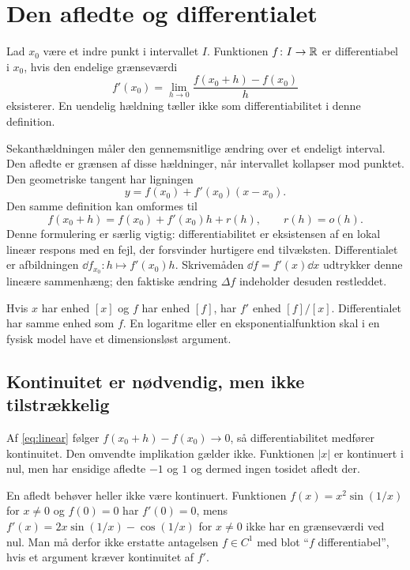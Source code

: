 \section{Den afledte og differentialet}
\label{sec:def}
\begin{definition}
Lad $x_0$ være et indre punkt i intervallet $I$. Funktionen $f\colon I\to\mathbb{R}$ er differentiabel i $x_0$, hvis den endelige grænseværdi
\[
 f'(x_0)=\lim_{h\to0}\frac{f(x_0+h)-f(x_0)}{h}
\]
eksisterer. En uendelig hældning tæller ikke som differentiabilitet i denne definition.
\end{definition}
Sekanthældningen måler den gennemsnitlige ændring over et endeligt interval. Den afledte er grænsen af disse hældninger, når intervallet kollapser mod punktet. Den geometriske tangent har ligningen
\[
 y=f(x_0)+f'(x_0)(x-x_0).
\]
Den samme definition kan omformes til
\begin{equation}
 f(x_0+h)=f(x_0)+f'(x_0)h+r(h),\qquad r(h)=o(h).
 \label{eq:linear}
\end{equation}
Denne formulering er særlig vigtig: differentiabilitet er eksistensen af en lokal lineær respons med en fejl, der forsvinder hurtigere end tilvæksten. Differentialet er afbildningen $\dd f_{x_0}\colon h\mapsto f'(x_0)h$. Skrivemåden $\dd f=f'(x)\dd x$ udtrykker denne lineære sammenhæng; den faktiske ændring $\Delta f$ indeholder desuden restleddet.

Hvis $x$ har enhed $[x]$ og $f$ har enhed $[f]$, har $f'$ enhed $[f]/[x]$. Differentialet har samme enhed som $f$. En logaritme eller en eksponentialfunktion skal i en fysisk model have et dimensionsløst argument.



\subsection{Kontinuitet er nødvendig, men ikke tilstrækkelig}
Af \eqref{eq:linear} følger $f(x_0+h)-f(x_0)\to0$, så differentiabilitet medfører kontinuitet. Den omvendte implikation gælder ikke. Funktionen $|x|$ er kontinuert i nul, men har ensidige afledte $-1$ og $1$ og dermed ingen tosidet afledt der.

En afledt behøver heller ikke være kontinuert. Funktionen $f(x)=x^2\sin(1/x)$ for $x\ne0$ og $f(0)=0$ har $f'(0)=0$, mens $f'(x)=2x\sin(1/x)-\cos(1/x)$ for $x\ne0$ ikke har en grænseværdi ved nul. Man må derfor ikke erstatte antagelsen $f\in C^1$ med blot ``$f$ differentiabel'', hvis et argument kræver kontinuitet af $f'$.

